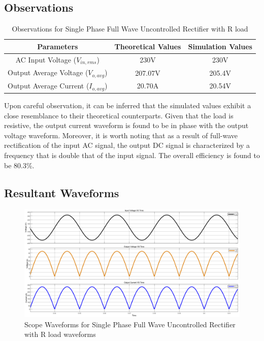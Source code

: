 \subsection{Observations}

\begin{table}[h]
    \renewcommand{\arraystretch}{1.3}
    \label{table_observation_circuit_1}
    \centering
    \begin{tabular}{|c|c|c|}
        \hline
        Parameters                              & Theoretical Values & Simulation Values \\
        \hline
        \hline
        AC Input Voltage ($ V_{in,rms} $)       & 230V               & 230V              \\
        \hline
        Output Average Voltage ($ V_{o,avg} $)  & 207.07V            & 205.4V            \\
        \hline
        Output Average Current ($ I_{o,avg}  $) & 20.70A             & 20.54V            \\
        \hline
    \end{tabular}
    \caption{Observations for Single Phase Full Wave Uncontrolled Rectifier with R load}

\end{table}


Upon careful observation, it can be inferred that the simulated values exhibit a close resemblance to their theoretical counterparts. Given that the load is resistive, the output current waveform is found to be in phase with the output voltage waveform. Moreover, it is worth noting that as a result of full-wave rectification of the input AC signal, the output DC signal is characterized by a frequency that is double that of the input signal.
The overall efficiency is found to be 80.3\%.
\pagebreak

\subsection{Resultant Waveforms}

\begin{figure}[h]
    \centering
    \includegraphics[width=1\textwidth]{images/experiment-2/circuit-scope-simulation-01.png}
    \caption{Scope Waveforms for Single Phase Full Wave Uncontrolled Rectifier with R load waveforms}
    \label{Fig_waveform_single-phase-full-wave-uncontrolled-rectifier-with-R-load}
\end{figure}

\pagebreak